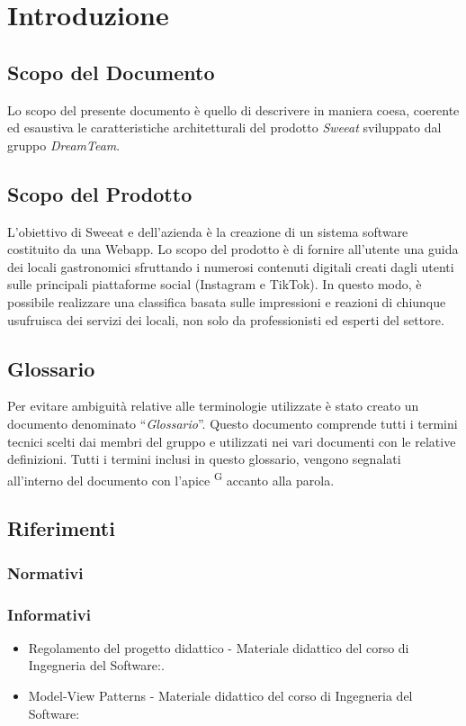 \section{Introduzione}

\subsection{Scopo del Documento}
Lo scopo del presente documento è quello di descrivere in maniera coesa, coerente ed esaustiva le caratteristiche architetturali del prodotto \textit{Sweeat} sviluppato dal gruppo \textit{DreamTeam}.


\subsection{Scopo del Prodotto}
L’obiettivo di Sweeat e dell’azienda \zd è la creazione di un sistema software costituito da una Webapp. Lo scopo del prodotto è di fornire all’utente una guida dei locali gastronomici sfruttando i numerosi contenuti digitali creati dagli utenti sulle principali piattaforme social (Instagram e TikTok).
In questo modo, è possibile realizzare una classifica basata sulle impressioni e reazioni di chiunque usufruisca dei servizi dei locali, non solo da professionisti ed esperti del settore.


\subsection{Glossario}
Per evitare ambiguità relative alle terminologie utilizzate è stato creato un documento denominato “\textit{Glossario}”. Questo documento comprende tutti i termini tecnici scelti dai membri del gruppo e utilizzati nei vari documenti con le relative definizioni. Tutti i termini inclusi in questo glossario, vengono segnalati all'interno del documento con l'apice \textsuperscript{G} accanto alla parola.

\subsection{Riferimenti}
\subsubsection{Normativi}

\subsubsection{Informativi}
\begin{itemize}
\item Regolamento del progetto didattico - Materiale didattico del corso di Ingegneria del Software:\newline {}.
\item Model-View Patterns - Materiale didattico del corso di Ingegneria del Software:
\newline {}
\end{itemize}